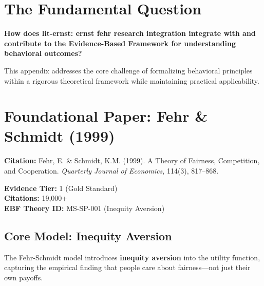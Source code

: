 \section{The Fundamental Question}
\label{sec:feh-fundamental}

\begin{tcolorbox}[
    colback=red!5!white,
    colframe=red!75!black,
    title={\textbf{Fundamental Question}}
]
\textbf{How does lit-ernst: ernst fehr research integration integrate with and contribute to the
Evidence-Based Framework for understanding behavioral outcomes?}

This appendix addresses the core challenge of formalizing behavioral principles
within a rigorous theoretical framework while maintaining practical applicability.
\end{tcolorbox}


\section{Foundational Paper: Fehr \& Schmidt (1999)}
\label{sec:fehr-schmidt-1999}

\begin{tcolorbox}[colback=green!5!white, colframe=green!75!black,
    title=\textbf{PAP-fehr1999theory: A Theory of Fairness, Competition, and Cooperation}]

\textbf{Citation:} Fehr, E. \& Schmidt, K.M. (1999). A Theory of Fairness,
Competition, and Cooperation. \textit{Quarterly Journal of Economics}, 114(3), 817--868.

\textbf{Evidence Tier:} 1 (Gold Standard) \\
\textbf{Citations:} 19,000+ \\
\textbf{EBF Theory ID:} MS-SP-001 (Inequity Aversion)

\end{tcolorbox}

\subsection{Core Model: Inequity Aversion}

The Fehr-Schmidt model introduces \textbf{inequity aversion} into the utility function,
capturing the empirical finding that people care about fairness---not just their own payoffs.


